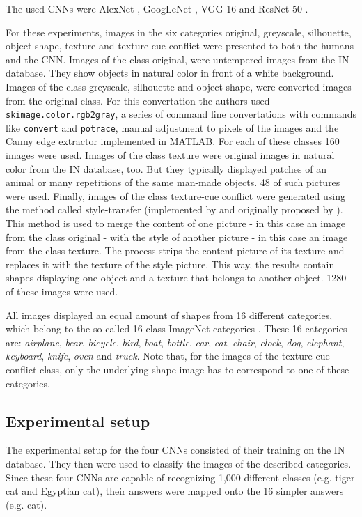 \documentclass[runningheads,a4paper]{llncs}
\begin{document}
The used CNNs were AlexNet \citep{krizhevsky2012imagenet}, GoogLeNet \citep{szegedy2015going}, VGG-16 \citep{simonyan2014very} and ResNet-50 \citep{he2016deep}.

For these experiments, images in the six categories original, greyscale, silhouette, object shape, texture  and texture-cue conflict were presented to both the humans and the CNN. Images of the class original, were untempered images from the IN database. They show objects in natural color in front of a white background.
Images of the class greyscale, silhouette and object shape, were converted images from the original class. For this convertation the authors used \texttt{skimage.color.rgb2gray}, a series of command line convertations with commands like \texttt{convert} and \texttt{potrace}, manual adjustment to pixels of the images and the Canny edge extractor implemented in MATLAB.
For each of these classes 160 images were used. Images of the class texture were original images in natural color from the IN database, too. But they typically displayed patches of an animal or many repetitions of the same man-made objects. 48 of such pictures were used. Finally, images of the class texture-cue conflict were generated using the method called style-transfer (implemented by \citet{huang2017arbitrary} and originally proposed by \citet{gatys2016image}).
This method is used to merge the content of one picture - in this case an image from the class original - with the style of another picture - in this case an image from the class texture. The process strips the content picture of its texture and replaces it with the texture of the style picture. This way, the results contain shapes displaying one object and a texture that belongs to another object. 1280 of these images were used.

All images displayed an equal amount of shapes from 16 different categories, which belong to the so called 16-class-ImageNet categories \citep{geirhos2018generalisation}. These 16 categories are: \textit{airplane}, \textit{bear}, \textit{bicycle}, \textit{bird}, \textit{boat}, \textit{bottle}, \textit{car}, \textit{cat}, \textit{chair}, \textit{clock}, \textit{dog}, \textit{elephant}, \textit{keyboard}, \textit{knife}, \textit{oven} and \textit{truck}. Note that, for the images of the texture-cue conflict class, only the underlying shape image has to correspond to one of these categories.

\subsection{Experimental setup} 
The experimental setup for the four CNNs consisted of their training on the IN database. They then were used to classify the images of the described categories. 
Since these four CNNs are capable of recognizing 1,000 different classes (e.g. tiger cat and Egyptian cat), their answers were mapped onto the 16 simpler answers (e.g. cat).
\end{document}
